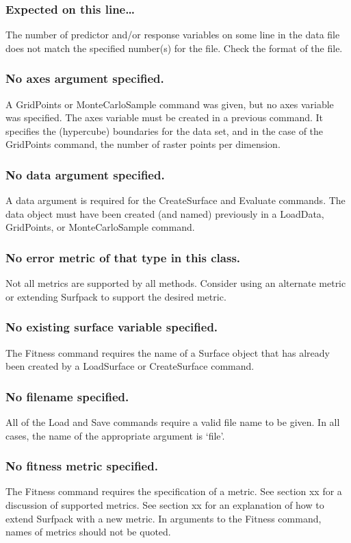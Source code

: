 \documentclass{article}
\begin{document}
\subsubsection{Expected on this line\ldots}
The number of predictor and/or response variables on some line in the data file
does not match the specified number(s) for the file.  Check the format of the
file.

\subsubsection{No axes argument specified.}
A GridPoints or MonteCarloSample command was given, but no axes variable was
specified.  The axes variable must be created in a previous command.  It
specifies the (hypercube) boundaries for the data set, and in the case of the
GridPoints command, the number of raster points per dimension.

\subsubsection{No data argument specified.}
A data argument is required for the CreateSurface and Evaluate commands.  The
data object must have been created (and named) previously in a LoadData,
GridPoints, or MonteCarloSample command.

\subsubsection{No error metric of that type in this class.}
Not all metrics are supported by all methods.  Consider using an alternate
metric or extending Surfpack to support the desired metric.

\subsubsection{No existing surface variable specified.}
The Fitness command requires the name of a Surface object that has already been
created by a LoadSurface or CreateSurface command.

\subsubsection{No filename specified.}
All of the Load and Save commands require a valid file name to be given.  In all
cases, the name of the appropriate argument is `file'.

\subsubsection{No fitness metric specified.}
The Fitness command requires the specification of a metric.  See section xx for
a discussion of supported metrics.  See section xx for an explanation of how to
extend Surfpack with a new metric.  In arguments to the Fitness command, names
of metrics should not be quoted.
\end{document}
